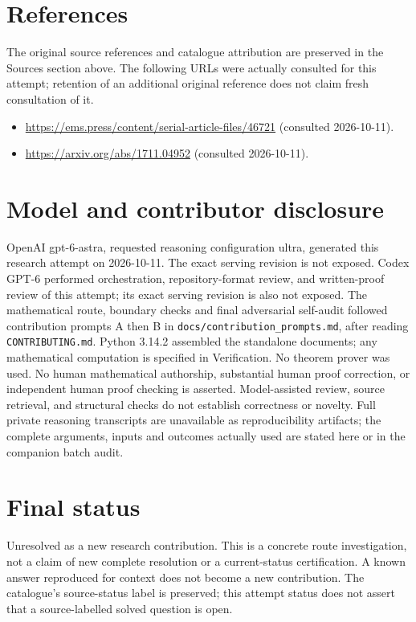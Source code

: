 \documentclass[11pt]{article}
\begin{document}
\section{References}
The original source references and catalogue attribution are preserved in the
Sources section above. The following URLs were actually consulted for this attempt;
retention of an additional original reference does not claim fresh consultation of it.
\begin{itemize}
\item \url{https://ems.press/content/serial-article-files/46721} (consulted 2026-10-11). 
\item \url{https://arxiv.org/abs/1711.04952} (consulted 2026-10-11). 
\end{itemize}
\section{Model and contributor disclosure}
OpenAI gpt-6-astra, requested reasoning configuration ultra, generated this research
attempt on 2026-10-11. The exact serving revision is not exposed. Codex GPT-6
performed orchestration, repository-format review, and written-proof review of this attempt; its exact serving revision
is also not exposed. The mathematical route, boundary checks and final adversarial
self-audit followed contribution prompts A then B in
\texttt{docs/contribution\_prompts.md}, after reading \texttt{CONTRIBUTING.md}.
Python 3.14.2 assembled the standalone documents; any mathematical computation is
specified in Verification. No theorem prover was used. No human mathematical
authorship, substantial human proof correction, or independent human proof checking
is asserted. Model-assisted review, source retrieval, and structural checks do not
establish correctness or novelty. Full private reasoning transcripts are unavailable
as reproducibility artifacts; the complete arguments, inputs and outcomes actually
used are stated here or in the companion batch audit.
\section{Final status}
Unresolved as a new research contribution. This is a concrete route investigation,
not a claim of new complete resolution or a current-status certification. A known
answer reproduced for context does not become a new contribution. The catalogue's
source-status label is preserved; this attempt status does not assert that a
source-labelled solved question is open.
\end{document}
